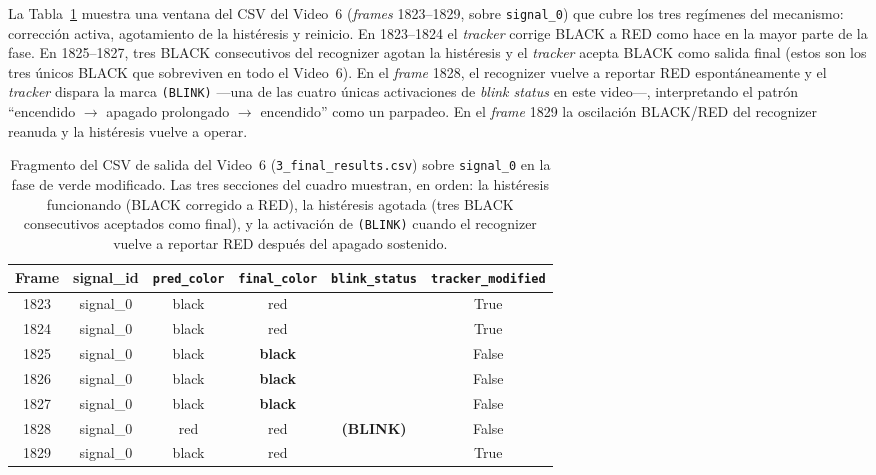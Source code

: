 La Tabla~\ref{tab:csv_histeresis} muestra una ventana del CSV del Video~6 (\textit{frames} 1823--1829, sobre \texttt{signal\_0}) que cubre los tres regímenes del mecanismo: corrección activa, agotamiento de la histéresis y reinicio. En 1823--1824 el \textit{tracker} corrige BLACK a RED como hace en la mayor parte de la fase. En 1825--1827, tres BLACK consecutivos del recognizer agotan la histéresis y el \textit{tracker} acepta BLACK como salida final (estos son los tres únicos BLACK que sobreviven en todo el Video~6). En el \textit{frame} 1828, el recognizer vuelve a reportar RED espontáneamente y el \textit{tracker} dispara la marca \texttt{(BLINK)} ---una de las cuatro únicas activaciones de \textit{blink status} en este video---, interpretando el patrón ``encendido $\to$ apagado prolongado $\to$ encendido'' como un parpadeo. En el \textit{frame} 1829 la oscilación BLACK/RED del recognizer reanuda y la histéresis vuelve a operar.

\begin{table}[H]
\centering
\small
\begin{tabular}{|c|c|c|c|c|c|}
\hline
\textbf{Frame} & \textbf{signal\_id} & \texttt{pred\_color} & \texttt{final\_color} & \texttt{blink\_status} & \texttt{tracker\_modified} \\
\hline
1823 & signal\_0 & black & red   &        & True  \\
1824 & signal\_0 & black & red   &        & True  \\
\hline
1825 & signal\_0 & black & \textbf{black} &        & False \\
1826 & signal\_0 & black & \textbf{black} &        & False \\
1827 & signal\_0 & black & \textbf{black} &        & False \\
\hline
1828 & signal\_0 & red   & red   & \textbf{(BLINK)} & False \\
1829 & signal\_0 & black & red   &        & True  \\
\hline
\end{tabular}
\caption{Fragmento del CSV de salida del Video~6 (\texttt{3\_final\_results.csv}) sobre \texttt{signal\_0} en la fase de verde modificado. Las tres secciones del cuadro muestran, en orden: la histéresis funcionando (BLACK corregido a RED), la histéresis agotada (tres BLACK consecutivos aceptados como final), y la activación de \texttt{(BLINK)} cuando el recognizer vuelve a reportar RED después del apagado sostenido.}
\label{tab:csv_histeresis}
\end{table}

